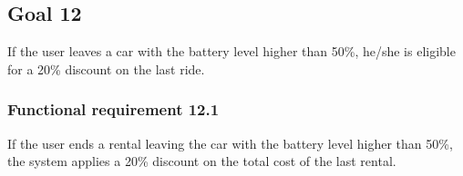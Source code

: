 \subsection{Goal 12}
If the user leaves a car with the battery level higher than 50\%, he/she is eligible for a 20\% discount on the last ride.

\setcounter{secnumdepth}{3}
\subsubsection{Functional requirement 12.1}
If the user ends a rental leaving the car with the battery level higher than 50\%, the system applies a 20\% discount on the total cost of the last rental.
